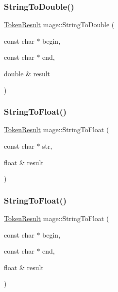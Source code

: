 \hypertarget{namespacemage_aaee12fa175aece0a6ffbaa8df4e63b60}{}\label{namespacemage_aaee12fa175aece0a6ffbaa8df4e63b60} 
\subsubsection{\texorpdfstring{String\+To\+Double()}{StringToDouble()}\hspace{0.1cm}{\footnotesize\ttfamily [2/2]}}
{\footnotesize\ttfamily \hyperlink{namespacemage_a2178ba2411db5912f41b2e7698c2037d}{Token\+Result} mage\+::\+String\+To\+Double (\begin{DoxyParamCaption}\item[{const char $\ast$}]{begin,  }\item[{const char $\ast$}]{end,  }\item[{double \&}]{result }\end{DoxyParamCaption})}

\hypertarget{namespacemage_a9353f738019573cfa93e504978bf6584}{}\label{namespacemage_a9353f738019573cfa93e504978bf6584} 
\subsubsection{\texorpdfstring{String\+To\+Float()}{StringToFloat()}\hspace{0.1cm}{\footnotesize\ttfamily [1/2]}}
{\footnotesize\ttfamily \hyperlink{namespacemage_a2178ba2411db5912f41b2e7698c2037d}{Token\+Result} mage\+::\+String\+To\+Float (\begin{DoxyParamCaption}\item[{const char $\ast$}]{str,  }\item[{float \&}]{result }\end{DoxyParamCaption})}

\hypertarget{namespacemage_a8610747ad641d27135bcd3a3d3c6b6c2}{}\label{namespacemage_a8610747ad641d27135bcd3a3d3c6b6c2} 
\subsubsection{\texorpdfstring{String\+To\+Float()}{StringToFloat()}\hspace{0.1cm}{\footnotesize\ttfamily [2/2]}}
{\footnotesize\ttfamily \hyperlink{namespacemage_a2178ba2411db5912f41b2e7698c2037d}{Token\+Result} mage\+::\+String\+To\+Float (\begin{DoxyParamCaption}\item[{const char $\ast$}]{begin,  }\item[{const char $\ast$}]{end,  }\item[{float \&}]{result }\end{DoxyParamCaption})}

